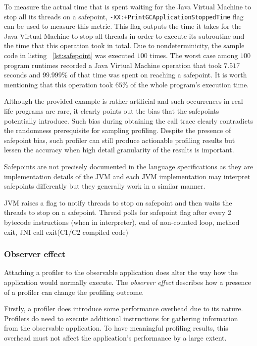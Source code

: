 \documentclass[..thesis.tex]{subfiles}
\begin{document}
To measure the actual time that is spent waiting for the Java Virtual Machine to stop all its threads on a safepoint, \texttt{-XX:+PrintGCApplicationStoppedTime} flag can be used to measure this metric. This flag outputs the time it takes for the Java Virtual Machine to stop all threads in order to execute its subroutine and the time that this operation took in total. Due to nondeterminicity, the sample code in listing ~\ref{lst:safepoint} was executed $100$ times. The worst case among $100$ program runtimes recorded a Java Virtual Machine operation that took $7.517$ seconds and $99.999\%$ of that time was spent on reaching a safepoint. It is worth mentioning that this operation took $65\%$ of the whole program's execution time.

Although the provided example is rather artificial and such occurrences in real life programs are rare, it clearly points out the bias that the safepoints potentially introduce. Such bias during obtaining the call trace clearly contradicts the randomness prerequisite for sampling profiling. Despite the presence of safepoint bias, such profiler can still produce actionable profiling results but lessen the accuracy when high detail granularity of the results is important.


Safepoints are not precisely documented in the language specifications as they are implementation details of the JVM and each JVM implementation may interpret safepoints differently but they generally work in a similar manner.

JVM raises a flag to notify threads to stop on safepoint and then waits the threads to stop on a safepoint. Thread polls for safepoint flag after every 2 bytecode instructions (when in interpreter), end of non-counted loop, method exit, JNI call exit(C1/C2 compiled code)

\subsubsection{Observer effect}

Attaching a profiler to the observable application does alter the way how the application would normally execute. The \textit{observer effect} describes how a presence of a profiler can change the profiling outcome.
 
Firstly, a profiler does introduce some performance overhead due to its nature. Profilers do need to execute additional instructions for gathering information from the observable application. To have meaningful profiling results, this overhead must not affect the application's performance by a large extent. 
\end{document}
